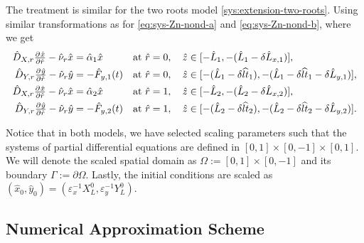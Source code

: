 \documentclass[11pt]{article}
\numberwithin{equation}{section}
\begin{document}
The treatment is similar for the two roots model \eqref{sys:extension-two-roots}. Using similar transformations as for \eqref{eq:sys-Zn-nond-a} and \eqref{eq:sys-Zn-nond-b}, where we get
\begin{align}
    \hat{D}_{X,r} \pd{\hat{x}}{\hat{r}} - \hat{\nu}_r \hat{x} &= \hat{\alpha}_1 \hat{x}
    &\text{at } \hat{r} &= 0, \quad \hat{z} \in [-\hat{L}_1,-(\hat{L}_1 - \delta \hat{L}_{x,1})],
    \\
    \hat{D}_{Y,r} \pd{\hat{y}}{\hat{r}}  - \hat{\nu}_r \hat{y} &= -\hat{F}_{y,1}(t)     &\text{at } \hat{r} &= 0, \quad \hat{z} \in [-(\hat{L}_1 - \delta \widehat{lt}_1), -(\hat{L}_1 - \delta \widehat{lt}_1 - \delta \hat{L}_{y,1})],
    \\
    \hat{D}_{X,r} \pd{\hat{x}}{\hat{r}} - \hat{\nu}_r \hat{x} &= \hat{\alpha}_2 \hat{x}
    &\text{at } \hat{r} &= 1, \quad \hat{z} \in [-\hat{L}_2, -(\hat{L}_2 - \delta \hat{L}_{x,2})],
    \\
    \hat{D}_{Y,r} \pd{\hat{y}}{\hat{r}}  - \hat{\nu}_r \hat{y} &= -\hat{F}_{y,2}(t)     &\text{at } \hat{r} &= 1, \quad \hat{z} \in [-(\hat{L}_2 - \delta \widehat{lt}_2), -(\hat{L}_2 - \delta \widehat{lt}_2 - \delta \hat{L}_{y,2})].
\end{align}



Notice that in both models, we have selected scaling parameters such that the systems of partial differential equations are defined in \([0,1]\times [0,-1] \times [0,1]\). We will denote the scaled spatial domain as \(\Omega := [0,1]\times [0,-1]\) and its boundary \(\Gamma := \partial \Omega\).
Lastly, the initial conditions are scaled as \( (\hat{x}_0,\hat{y}_0) = (\varepsilon_x^{-1} X^0_L, \varepsilon_y^{-1} Y^0_L) \). 




\subsection{Numerical Approximation Scheme}
\label{sec:Numerics-base}
\end{document}
